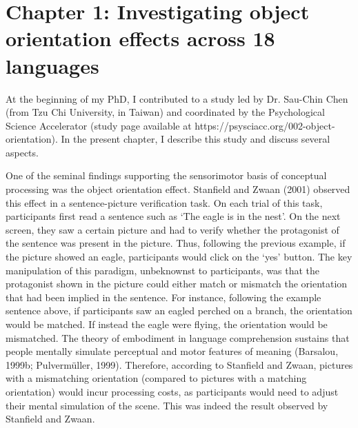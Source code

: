 \documentclass[
  12pt,
  man,floatsintext]{apa7}
\begin{document}
\clearpage

\hypertarget{chapter-1-investigating-object-orientation-effects-across-18-languages}{%
\section{Chapter 1: Investigating object orientation effects across 18 languages}\label{chapter-1-investigating-object-orientation-effects-across-18-languages}}

\bigskip
\bigskip
\bigskip

\begin{adjustwidth}{1.5cm}{1.5cm}

At the beginning of my PhD, I contributed to a study led by Dr. Sau-Chin Chen (from Tzu Chi University, in Taiwan) and coordinated by the Psychological Science Accelerator (study page available at https://psysciacc.org/002-object-orientation). In the present chapter, I describe this study and discuss several aspects.

\end{adjustwidth}

\bigskip
\bigskip
\bigskip

One of the seminal findings supporting the sensorimotor basis of conceptual processing was the object orientation effect. Stanfield and Zwaan (2001) observed this effect in a sentence-picture verification task. On each trial of this task, participants first read a sentence such as `The eagle is in the nest'. On the next screen, they saw a certain picture and had to verify whether the protagonist of the sentence was present in the picture. Thus, following the previous example, if the picture showed an eagle, participants would click on the `yes' button. The key manipulation of this paradigm, unbeknownst to participants, was that the protagonist shown in the picture could either match or mismatch the orientation that had been implied in the sentence. For instance, following the example sentence above, if participants saw an eagled perched on a branch, the orientation would be matched. If instead the eagle were flying, the orientation would be mismatched. The theory of embodiment in language comprehension sustains that people mentally simulate perceptual and motor features of meaning (Barsalou, 1999b; Pulvermüller, 1999). Therefore, according to Stanfield and Zwaan, pictures with a mismatching orientation (compared to pictures with a matching orientation) would incur processing costs, as participants would need to adjust their mental simulation of the scene. This was indeed the result observed by Stanfield and Zwaan.
\end{document}
